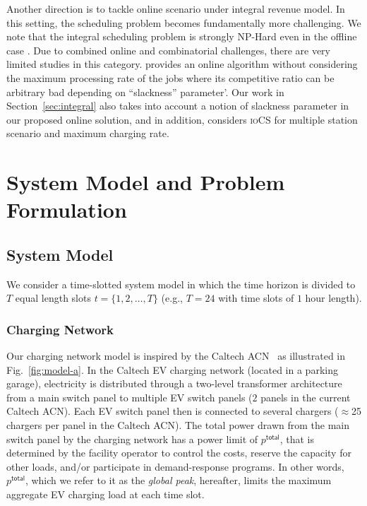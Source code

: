 \documentclass[journal]{IEEEtran}
\newcommand{\rev}[1]{{\color{black}#1}}%
\newcommand{\rev}[1]{#1}
\newcommand{\iocs}{\textsc{ioCS}\xspace}
\begin{document}
{Another direction is to tackle online scenario under integral revenue model. In this setting, the scheduling problem becomes fundamentally more challenging. We note that the integral scheduling problem is strongly NP-Hard even in the offline case \cite{de2018complexity}. Due to combined online and combinatorial challenges, there are very limited studies in this category. \cite{lucier2013efficient} provides an online algorithm without considering the maximum processing rate of the jobs where its competitive ratio can be arbitrary bad depending on ``slackness'' parameter'. Our work in Section~\ref{sec:integral} also takes into account a notion of slackness parameter in our proposed online solution, and in addition, considers \iocs for multiple station scenario and maximum charging rate.
}

\section{System Model and Problem Formulation}
		\label{sec:model}
		
		
		
		\subsection{System Model}
		We consider a time-slotted system model in which the time horizon is divided to $T$ equal length slots ${t=\{1, 2, \dots ,T\}}$ (e.g., $T=24$ with time slots of $1$ hour length).
\subsubsection{Charging Network}
\label{sec:acn}
Our charging network model is inspired by the Caltech ACN~\cite{lee2016adaptive} as illustrated in Fig.~\ref{fig:model-a}. In \rev{the} Caltech EV charging network (located in a parking garage), electricity is distributed through a two-level transformer architecture from a main switch panel to multiple EV switch panels (\rev{$2$} panels in the current Caltech ACN). Each EV switch panel then is connected to several chargers ($\approx$25 chargers \rev{per panel} in the Caltech ACN). The total power drawn from the main switch panel \rev{by} the charging network has a power limit of  $p^\mathsf{total}$, that is determined by the facility operator to control the costs, reserve the capacity for other loads, and/or participate in demand-response programs.  
In other words, $p^\mathsf{total}$, which we refer to it as the \textit{global peak}, hereafter, limits the maximum aggregate EV charging load at each time slot. 
\end{document}
